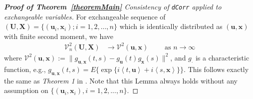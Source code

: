 \documentclass[11pt]{article}
\theoremstyle{definition}
\begin{document}
\begin{proof}[\textbf{Proof of Theorem~\ref{theoremMain}} Consistency of \texttt{dCorr} applied to exchangeable variables]
	
For exchangeable sequence of $(\mathbf{U}, \mathbf{X}) = \{ (\mathbf{u}_{i}, \mathbf{x}_{i}) ; i = 1,2, \ldots, n \}$ which is identically distributed as $(\mathbf{u}, \mathbf{x})$ with finite second moment,  we have 
\begin{eqnarray}
\mathcal{V}_{n}^{2}(\mathbf{U},\mathbf{X}) &\longrightarrow \mathcal{V}^{2}(\mathbf{u},\mathbf{x}) \quad \quad \mbox{ as } n \rightarrow \infty
\label{eq:conv1}
\end{eqnarray}
where $\mathcal{V}^{2} (\mathbf{u},\mathbf{x}) := \| g_{\mathbf{u},\mathbf{x}}(t,s) - g_{\mathbf{u}}(t) g_{\mathbf{x}}(s) \|^2$, and $g_{\cdot}$ is a characteristic function, e.g., $g_{\mathbf{u},\mathbf{x}}(t,s) = E\{\exp\{i \left\langle t,\mathbf{u} \right\rangle  +i \left\langle  s,\mathbf{x}\right\rangle \}\}$. This follows exactly the same as \textit{Theorem 1} in \cite{szekely2007measuring}. Note that this Lemma always holds without any assumption on $\{(\mathbf{u}_{i},\mathbf{x}_{i}), i=1,2,...,n\}$.


\end{proof}
\end{document}
